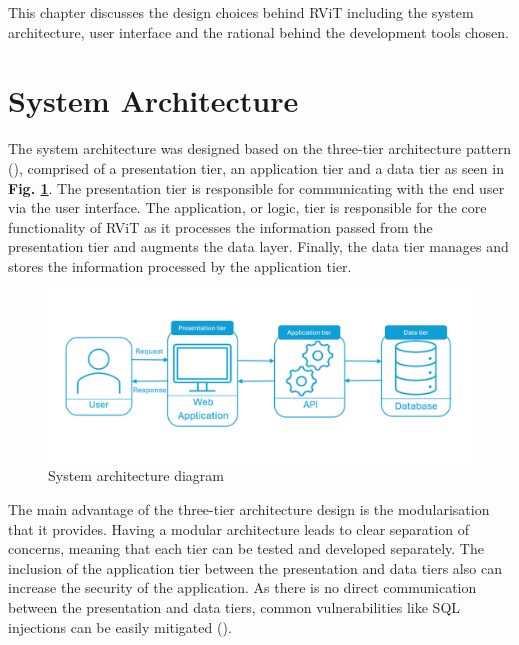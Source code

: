 \documentclass[l4proj.tex]{subfiles}
\begin{document}
    

This chapter discusses the design choices behind RViT including the system architecture, user interface and the rational behind the development tools chosen. 

\section{System Architecture}

The system architecture was designed based on the three-tier architecture pattern (\cite{IBM3Tier}), comprised of a presentation tier, an application tier and a data tier as seen in \textbf{Fig. \ref{fig:achitecture pattern}}. The presentation tier is responsible for communicating with the end user via the user interface. The application, or logic, tier is responsible for the core functionality of RViT as it processes the information passed from the presentation tier and augments the data layer. Finally, the data tier manages and stores the information processed by the application tier.

\begin{figure}[h!]
\begin{center}
\includegraphics[scale=0.6]{dissertation/images/System Architecture.png}
\caption{System architecture diagram}
\label{fig:achitecture pattern} 
\end{center}
\end{figure}

The main advantage of the three-tier architecture design is the modularisation that it provides. Having a modular architecture leads to clear separation of concerns, meaning that each tier can be tested and developed separately. The inclusion of the application tier between the presentation and data tiers also can increase the security of the application. As there is no direct communication between the presentation and data tiers, common vulnerabilities like SQL injections can be easily mitigated (\cite{IBM3Tier}).
\end{document}
